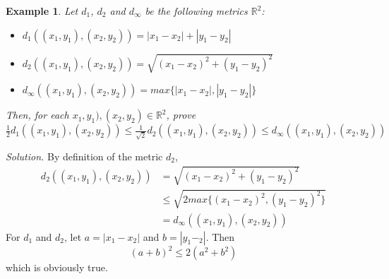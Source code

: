 \documentclass[12pt,a4paper]{article}
\theoremstyle{plain}
\newtheorem{example}[theorem]{Example}
\begin{document}
\begin{example}
    Let $d_1$, $d_2$ and $d_{\infty}$ be the following metrics $\mathbb{R}^2$:
    \begin{itemize}
        \item $d_1((x_1,y_1),(x_2,y_2))=|x_1-x_2|+|y_1-y_2|$
        \item $d_2((x_1,y_1),(x_2,y_2))=\sqrt{(x_1-x_2)^2+(y_1-y_2)^2}$
        \item $d_{\infty}((x_1,y_1),(x_2,y_2))=max\{|x_1-x_2|,|y_1-y_2|\}$
    \end{itemize}
    Then, for each $x_1,y_1),(x_2,y_2)\in \mathbb{R}^2$, prove\\
    $\frac12d_1((x_1,y_1),(x_2,y_2))\leq \frac{1}{\sqrt{2}}d_2((x_1,y_1),(x_2,y_2)) \leq d_{\infty}((x_1,y_1),(x_2,y_2))$
\end{example}
\noindent\emph{Solution.}
By definition of the metric $d_2$,
\begin{equation}
    \begin{split}
    d_2((x_1,y_1),(x_2,y_2)) &= \sqrt{(x_1-x_2)^2+(y_1-y_2)^2} \\
    &\leq \sqrt{2max\{(x_1-x_2)^2, (y_1-y_2)^2\}} \\
    &=d_{\infty}((x_1,y_1),(x_2,y_2))
    \end{split}
\end{equation}
For $d_1$ and $d_2$, let $a=|x_1-x_2|$ and $b=|y_1-_2|$. Then
\begin{equation}
    (a+b)^2 \leq 2(a^2+b^2)
\end{equation}
which is obviously true. 
\end{document}
